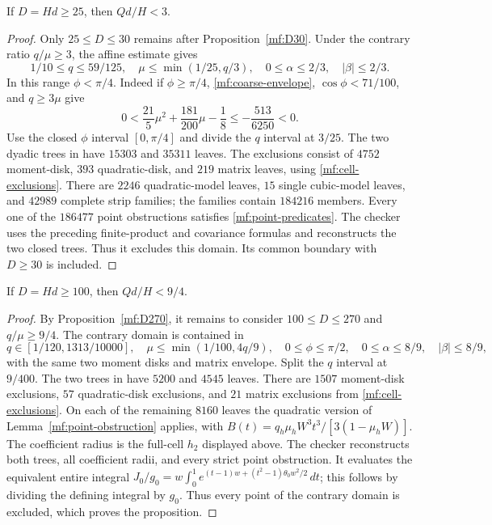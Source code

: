 \begin{proposition}\label{mf:D25}
If $D=Hd\ge25$, then $Qd/H<3$.
\end{proposition}
\begin{proof}
Only $25\le D\le30$ remains after Proposition~\ref{mf:D30}.
Under the contrary ratio $q/\mu\ge3$, the affine estimate gives
\[
 1/10\le q\le59/125,\quad \mu\le\min(1/25,q/3),\quad
 0\le\alpha\le2/3,\quad|\beta|\le2/3.
\]
In this range $\phi<\pi/4$. Indeed if $\phi\ge\pi/4$,
\eqref{mf:coarse-envelope}, $\cos\phi<71/100$, and
$q\ge3\mu$ give
\[
 0<\frac{21}{5}\mu^2+\frac{181}{200}\mu-\frac18
 \le-\frac{513}{6250}<0.
\]
Use the closed $\phi$ interval $[0,\pi/4]$ and divide
the $q$ interval at $3/25$.
The two dyadic trees in
have $15303$ and $35311$ leaves. The exclusions consist of
$4752$ moment-disk, $393$ quadratic-disk, and $219$ matrix
leaves, using \eqref{mf:cell-exclusions}.
There are $2246$ quadratic-model leaves, $15$ single
cubic-model leaves, and $42989$ complete strip families;
the families contain $184216$ members.
Every one of the $186477$ point obstructions satisfies
\eqref{mf:point-predicates}.
The checker 
uses the preceding finite-product and covariance formulas and
reconstructs the two closed trees.
Thus it excludes this domain. Its common boundary
with $D\ge30$ is included.
\end{proof}

\begin{proposition}\label{mf:D100}
If $D=Hd\ge100$, then $Qd/H<9/4$.
\end{proposition}
\begin{proof}
By Proposition~\ref{mf:D270}, it remains to consider
$100\le D\le270$ and $q/\mu\ge9/4$.
The contrary domain is contained in
\[
 q\in[1/120,1313/10000],\quad
 \mu\le\min(1/100,4q/9),\quad
 0\le\phi\le\pi/2,\quad
 0\le\alpha\le8/9,\quad|\beta|\le8/9,
\]
with the same two moment disks and matrix envelope.
Split the $q$ interval at $9/400$. The two trees in
 have $5200$ and $4545$ leaves.
There are $1507$ moment-disk exclusions, $57$ quadratic-disk
exclusions, and $21$ matrix exclusions from
\eqref{mf:cell-exclusions}. On each of the
remaining $8160$ leaves the quadratic version of
Lemma~\ref{mf:point-obstruction} applies, with
$B(t)=q_h\mu_hW^3t^3/[3(1-\mu_hW)]$.
The coefficient radius is the full-cell $h_2$ displayed above.
The checker  reconstructs
both trees, all coefficient radii, and every strict
point obstruction. It evaluates the equivalent entire integral
$J_0/g_0=w\int_0^1e^{(t-1)w+(t^2-1)\theta_0w^2/2}\,dt$;
this follows by dividing the defining integral by $g_0$.
Thus every point of the contrary domain is excluded, which
proves the proposition.
\end{proof}
